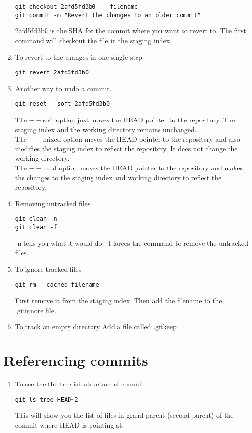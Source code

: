 \documentclass[paper=a4, fontsize=12pt]{scrartcl}
\begin{document}
\begin{enumerate}
\begin{lstlisting}
git checkout 2afd5fd3b0 -- filename
git commit -m "Revert the changes to an older commit"
\end{lstlisting}
2afd5fd3b0 is the SHA for the commit where you want to revert to. The first command will checkout the file in the staging index.
\item To revert to the changes in one single step
\begin{lstlisting}
git revert 2afd5fd3b0
\end{lstlisting}
\item Another way to undo a commit.
\begin{lstlisting}
git reset --soft 2afd5fd3b0 
\end{lstlisting}
The $--$soft option just moves the HEAD pointer to the repository. The staging index and the working directory remains unchanged.\\
The $--$mixed option moves the HEAD pointer to the repository and also modifies the staging index to reflect the repository. It does not change the working directory.\\
The $--$hard option moves the HEAD pointer to the repository and makes the changes to the staging index and working directory to reflect the repository.
\item Removing untracked files
\begin{lstlisting}
git clean -n
git clean -f
\end{lstlisting}
-n tells you what it would do.
-f forces the command to remove the untracked files.
\item To ignore tracked files
\begin{lstlisting}
git rm --cached filename
\end{lstlisting}
First remove it from the staging index. Then add the filename to the .gitignore file.
\item To track an empty directory
Add a file called .gitkeep
\end{enumerate}

\section*{Referencing commits}
\begin{enumerate}
\item To see the the tree-ish structure of commit
\begin{lstlisting}
git ls-tree HEAD~2
\end{lstlisting}
This will show you the list of files in grand parent (second parent) of the commit where HEAD is pointing at.
\end{enumerate}
\end{document}
